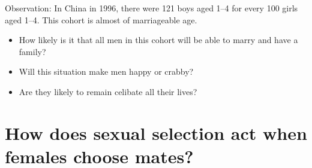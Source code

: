 \begin{frame}[t]
    \begin{adjustwidth}{-2em}{-1.5em}
        Observation: In China in 1996, there were 121 boys aged 1--4 for every
        100 girls aged 1--4. This cohort is almost of marriageable age.

        \begin{itemize}
            \item How likely is it that all men in this cohort will
                be able to marry and have a family?
            
                \vspace{4mm}
            \item Will this situation make men happy or crabby?

                \vspace{4mm}
            \item Are they likely to remain celibate all their lives?
        \end{itemize}


    \end{adjustwidth}
\end{frame}

\section[How does sexual selection act when females choose mates?]{How does
    sexual selection act when females choose mates?}

